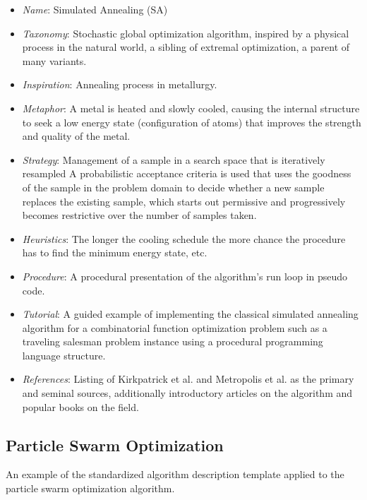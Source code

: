\documentclass[a4paper, 11pt]{article}
\begin{document}
\begin{itemize}
	\item \emph{Name}: Simulated Annealing (SA)
	\item \emph{Taxonomy}: Stochastic global optimization algorithm, inspired by a physical process in the natural world, a sibling of extremal optimization, a parent of many variants. 
	\item \emph{Inspiration}: Annealing process in metallurgy. 
	\item \emph{Metaphor}: A metal is heated and slowly cooled, causing the internal structure to seek a low energy state (configuration of atoms) that improves the strength and quality of the metal. 
	\item \emph{Strategy}: Management of a sample in a search space that is iteratively resampled A probabilistic acceptance criteria is used that uses the goodness of the sample in the problem domain to decide whether a new sample replaces the existing sample, which starts out permissive and progressively becomes restrictive over the number of samples taken. 
	\item \emph{Heuristics}: The longer the cooling schedule the more chance the procedure has to find the minimum energy state, etc.
	\item \emph{Procedure}: A procedural presentation of the algorithm's run loop in pseudo code.
	\item \emph{Tutorial}: A guided example of implementing the classical simulated annealing algorithm for a combinatorial function optimization problem such as a traveling salesman problem instance using a procedural programming language structure.
	\item \emph{References}: Listing of Kirkpatrick et al. and Metropolis et al. as the primary and seminal sources, additionally introductory articles on the algorithm and popular books on the field.
\end{itemize}

\subsection{Particle Swarm Optimization}
An example of the standardized algorithm description template applied to the particle swarm optimization algorithm.
\end{document}
